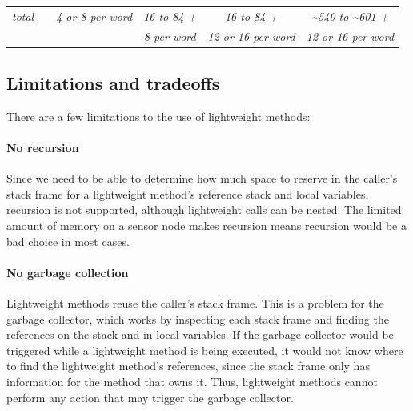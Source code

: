 \begin{table}
{\begin{tabular}{lccccc}
    \\
    \emph{total}                                              &                 & \emph{4 or 8 per word}  & \emph{16 to 84 +}           & \emph{16 to 84 +}           & \emph{\textasciitilde 540 to \textasciitilde 601 +} \\
                                                              &                 &                         & \emph{8 per word}           & \emph{12 or 16 per word}    & \emph{12 or 16 per word}                            \\
    \bottomrule
    \end{tabular}
    }
\end{table}


\subsection{Limitations and tradeoffs}
There are a few limitations to the use of lightweight methods:
\paragraph{No recursion} Since we need to be able to determine how much space to reserve in the caller's stack frame for a lightweight method's reference stack and local variables, recursion is not supported, although lightweight calls can be nested. The limited amount of memory on a sensor node makes recursion means recursion would be a bad choice in most cases.

\paragraph{No garbage collection}
Lightweight methods reuse the caller's stack frame. This is a problem for the garbage collector, which works by inspecting each stack frame and finding the references on the stack and in local variables. If the garbage collector would be triggered while a lightweight method is being executed, it would not know where to find the lightweight method's references, since the stack frame only has information for the method that owns it. Thus, lightweight methods cannot perform any action that may trigger the garbage collector.

